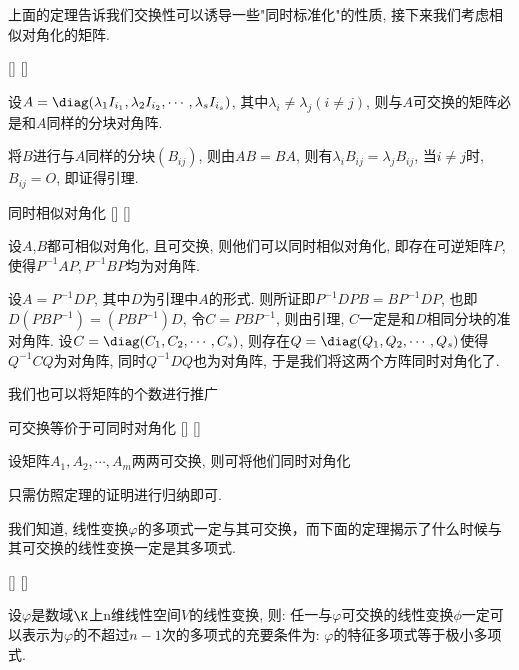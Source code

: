 \documentclass[UTF8]{ctexart}
\begin{document}
		上面的定理告诉我们交换性可以诱导一些"同时标准化"的性质, 接下来我们考虑相似对角化的矩阵.\\
		\begin{lma}
			[]
			{}
			[]
			[]
			
			设$A=\diag(\lambda_1I_{i_1},\lambda_2I_{i_2},\cdots,\lambda_sI_{i_s})$, 其中$\lambda_i\neq\lambda_j(i\neq j)$, 则与$A$可交换的矩阵必是和$A$同样的分块对角阵.
		\end{lma}
		\begin{prf}
			将$B$进行与$A$同样的分块$(B_{ij})$, 则由$AB=BA$, 则有$\lambda_iB_{ij}=\lambda_jB_{ij}$, 当$i\neq j$时, $B_{ij}=O$, 即证得引理.
		\end{prf}
		\begin{thm}
			[]
			{同时相似对角化}
			[]
			[]
			
			设$A$,$B$都可相似对角化, 且可交换, 则他们可以同时相似对角化, 即存在可逆矩阵$P$, 使得$P^{-1}AP,P^{-1}BP$均为对角阵.
		\end{thm}
		
		\begin{prf}
			设$A=P^{-1}DP$, 其中$D$为引理中$A$的形式. 则所证即$P^{-1}DPB=BP^{-1}DP$, 也即$D(PBP^{-1})=(PBP^{-1})D$, 令$C=PBP^{-1}$, 则由引理, $C$一定是和$D$相同分块的准对角阵. 设$C=\diag(C_1,C_2,\cdots,C_s)$, 则存在$Q=\diag(Q_1,Q_2,\cdots,Q_s)$使得$Q^{-1}CQ$为对角阵, 同时$Q^{-1}DQ$也为对角阵, 于是我们将这两个方阵同时对角化了.
		\end{prf}
		我们也可以将矩阵的个数进行推广
		\begin{crl}
			[]
			{可交换等价于可同时对角化}
			[]
			[]
			
			设矩阵$A_1,A_2,\cdots,A_m$两两可交换, 则可将他们同时对角化
		\end{crl}
		\begin{prf}
			只需仿照定理的证明进行归纳即可.
		\end{prf}

		我们知道, 线性变换$\varphi$的多项式一定与其可交换，而下面的定理揭示了什么时候与其可交换的线性变换一定是其多项式.
		\begin{thm}
			[]
			{}
			[]
			[]
			
			设$\varphi$是数域$\K$上n维线性空间$V$的线性变换, 则: 任一与$\varphi$可交换的线性变换$\phi$一定可以表示为$\varphi$的不超过$n-1$次的多项式的充要条件为: $\varphi$的特征多项式等于极小多项式.
		\end{thm}
\end{document}
